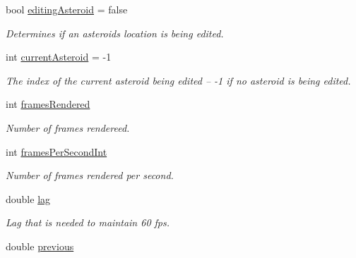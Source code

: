 \begin{DoxyCompactItemize}
\mbox{\label{class_tool_a36e1087bb60c86e9585502155533ee6e}} 
bool \mbox{\hyperlink{class_tool_a36e1087bb60c86e9585502155533ee6e}{editing\+Asteroid}} = false
\begin{DoxyCompactList}\small\item\em Determines if an asteroid\textquotesingle{}s location is being edited. \end{DoxyCompactList}\item 
\mbox{\label{class_tool_a8abcd0bcce41a26deedeaaf574212c47}} 
int \mbox{\hyperlink{class_tool_a8abcd0bcce41a26deedeaaf574212c47}{current\+Asteroid}} = -\/1
\begin{DoxyCompactList}\small\item\em The index of the current asteroid being edited -- -\/1 if no asteroid is being edited. \end{DoxyCompactList}\item 
\mbox{\label{class_tool_aba87b7078c3d7f622ab585b2c2c5047d}} 
int \mbox{\hyperlink{class_tool_aba87b7078c3d7f622ab585b2c2c5047d}{frames\+Rendered}}
\begin{DoxyCompactList}\small\item\em Number of frames rendereed. \end{DoxyCompactList}\item 
\mbox{\label{class_tool_a4575eb3ae08c5f2b39da73d1d3c60779}} 
int \mbox{\hyperlink{class_tool_a4575eb3ae08c5f2b39da73d1d3c60779}{frames\+Per\+Second\+Int}}
\begin{DoxyCompactList}\small\item\em Number of frames rendered per second. \end{DoxyCompactList}\item 
\mbox{\label{class_tool_a987e34a581fae97d5d885cd9f2ce5ba9}} 
double \mbox{\hyperlink{class_tool_a987e34a581fae97d5d885cd9f2ce5ba9}{lag}}
\begin{DoxyCompactList}\small\item\em Lag that is needed to maintain 60 fps. \end{DoxyCompactList}\item 
\mbox{\label{class_tool_a56d0e09310d9effed0bf8c0e47a87309}} 
double \mbox{\hyperlink{class_tool_a56d0e09310d9effed0bf8c0e47a87309}{previous}}

\end{DoxyCompactItemize}
